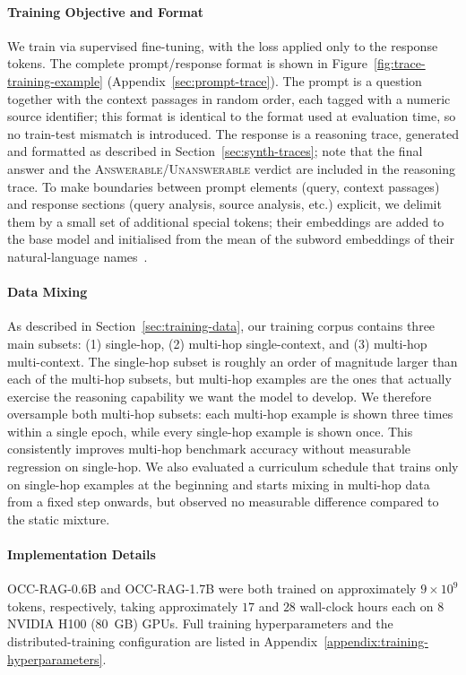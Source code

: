 \documentclass{llmxive}
\begin{document}
\paragraph{Training Objective and Format}
We train via supervised fine-tuning, with the loss applied only to the response tokens. The complete prompt/response format is shown in Figure~\ref{fig:trace-training-example} (Appendix~\ref{sec:prompt-trace}). The prompt is a question together with the context passages in random order, each tagged with a numeric source identifier; this format is identical to the format used at evaluation time, so no train-test mismatch is introduced. The response is a reasoning trace, generated and formatted as described in Section~\ref{sec:synth-traces}; note that the final answer and the \textsc{Answerable}/\textsc{Unanswerable} verdict are included in the reasoning trace. To make boundaries between prompt elements (query, context passages) and response sections (query analysis, source analysis, etc.) explicit, we delimit them by a small set of additional special tokens; their embeddings are added to the base model and initialised from the mean of the subword embeddings of their natural-language names~\citep{hewitt2021vocab}.

\paragraph{Data Mixing}
As described in Section~\ref{sec:training-data}, our training corpus contains three main subsets: (1) single-hop, (2) multi-hop single-context, and (3) multi-hop multi-context. The single-hop subset is roughly an order of magnitude larger than each of the multi-hop subsets, but multi-hop examples are the ones that actually exercise the reasoning capability we want the model to develop. We therefore oversample both multi-hop subsets: each multi-hop example is shown three times within a single epoch, while every single-hop example is shown once. This consistently improves multi-hop benchmark accuracy without measurable regression on single-hop. We also evaluated a curriculum schedule that trains only on single-hop examples at the beginning and starts mixing in multi-hop data from a fixed step onwards, but observed no measurable difference compared to the static mixture.

\paragraph{Implementation Details}
OCC-RAG-0.6B and OCC-RAG-1.7B were both trained on approximately $9 \times 10^9$ tokens, respectively, taking approximately $17$ and $28$ wall-clock hours each on $8$ NVIDIA H100 (80~GB) GPUs. Full training hyperparameters and the distributed-training configuration are listed in Appendix~\ref{appendix:training-hyperparameters}.
\end{document}
